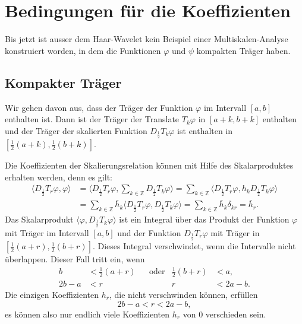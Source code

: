 %
%
%
\section{Bedingungen für die Koeffizienten\label{section:bedingungen}}
Bis jetzt ist ausser dem Haar-Wavelet kein Beispiel einer
Multiskalen-Analyse konstruiert worden, in dem die Funktionen 
$\varphi$ und $\psi$ kompakten Träger haben.

\subsection{Kompakter Träger}
Wir gehen davon aus, dass der Träger der Funktion $\varphi$ im Intervall
$[a,b]$ enthalten ist.
Dann ist der Träger der Translate $T_k\varphi$ in $[a+k,b+k]$ enthalten
und der Träger der skalierten Funktion $D_{\frac12}T_k\varphi$ ist
enthalten in $[\frac12(a+k),\frac12(b+k)]$.

Die Koeffizienten der Skalierungsrelation können mit Hilfe des
Skalarproduktes erhalten werden, denn es gilt:
\begin{align*}
\langle D_{\frac12}T_r\varphi, \varphi\rangle
&=
\biggl\langle
D_{\frac12}T_r\varphi, \sum_{k\in\mathbb Z} D_{\frac12}T_k\varphi
\biggr\rangle
=
\sum_{k\in\mathbb Z}
\langle
D_{\frac12}T_r\varphi,
h_kD_{\frac12}T_k\varphi
\rangle
\\
&=
\sum_{k\in\mathbb Z}
\bar{h}_k
\langle
D_{\frac12}T_r\varphi,
D_{\frac12}T_k\varphi
\rangle
=
\sum_{k\in\mathbb Z}
\bar{h}_k
\delta_{kr}
=
\bar{h}_r.
\end{align*}
Das Skalarprodukt
$\langle \varphi, D_{\frac12}T_k\varphi\rangle$
ist ein Integral über das Produkt der Funktion $\varphi$ mit Träger im Intervall
$[a,b]$ und der Funktion $D_{\frac12}T_r\varphi$  mit Träger in
$[\frac12(a+r),\frac12(b+r)]$.
Dieses Integral verschwindet, wenn die Intervalle nicht überlappen.
Dieser Fall tritt ein, wenn
\[
\begin{aligned}
b&<\frac12(a+r) &&\text{oder}& \frac12(b+r) &< a,
\\
2b-a&<r         &&           &            r &< 2a-b.
\end{aligned}
\]
Die einzigen Koeffizienten $h_r$, die nicht verschwinden können, erfüllen
\[
2b-a < r < 2a-b,
\]
es können also nur endlich viele Koeffizienten $h_r$ von $0$ verschieden
sein.

